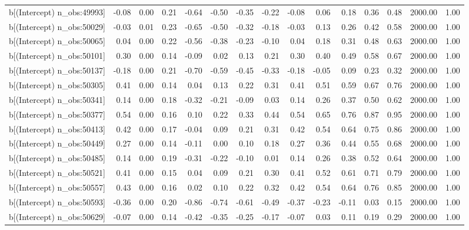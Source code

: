 \begin{table}[ht]
\begin{tabular}{rrrrrrrrrrrrrrr}
  b[(Intercept) n\_obs:49993] & -0.08 & 0.00 & 0.21 & -0.64 & -0.50 & -0.35 & -0.22 & -0.08 & 0.06 & 0.18 & 0.36 & 0.48 & 2000.00 & 1.00 \\ 
  b[(Intercept) n\_obs:50029] & -0.03 & 0.01 & 0.23 & -0.65 & -0.50 & -0.32 & -0.18 & -0.03 & 0.13 & 0.26 & 0.42 & 0.58 & 2000.00 & 1.00 \\ 
  b[(Intercept) n\_obs:50065] & 0.04 & 0.00 & 0.22 & -0.56 & -0.38 & -0.23 & -0.10 & 0.04 & 0.18 & 0.31 & 0.48 & 0.63 & 2000.00 & 1.00 \\ 
  b[(Intercept) n\_obs:50101] & 0.30 & 0.00 & 0.14 & -0.09 & 0.02 & 0.13 & 0.21 & 0.30 & 0.40 & 0.49 & 0.58 & 0.67 & 2000.00 & 1.00 \\ 
  b[(Intercept) n\_obs:50137] & -0.18 & 0.00 & 0.21 & -0.70 & -0.59 & -0.45 & -0.33 & -0.18 & -0.05 & 0.09 & 0.23 & 0.32 & 2000.00 & 1.00 \\ 
  b[(Intercept) n\_obs:50305] & 0.41 & 0.00 & 0.14 & 0.04 & 0.13 & 0.22 & 0.31 & 0.41 & 0.51 & 0.59 & 0.67 & 0.76 & 2000.00 & 1.00 \\ 
  b[(Intercept) n\_obs:50341] & 0.14 & 0.00 & 0.18 & -0.32 & -0.21 & -0.09 & 0.03 & 0.14 & 0.26 & 0.37 & 0.50 & 0.62 & 2000.00 & 1.00 \\ 
  b[(Intercept) n\_obs:50377] & 0.54 & 0.00 & 0.16 & 0.10 & 0.22 & 0.33 & 0.44 & 0.54 & 0.65 & 0.76 & 0.87 & 0.95 & 2000.00 & 1.00 \\ 
  b[(Intercept) n\_obs:50413] & 0.42 & 0.00 & 0.17 & -0.04 & 0.09 & 0.21 & 0.31 & 0.42 & 0.54 & 0.64 & 0.75 & 0.86 & 2000.00 & 1.00 \\ 
  b[(Intercept) n\_obs:50449] & 0.27 & 0.00 & 0.14 & -0.11 & 0.00 & 0.10 & 0.18 & 0.27 & 0.36 & 0.44 & 0.55 & 0.68 & 2000.00 & 1.00 \\ 
  b[(Intercept) n\_obs:50485] & 0.14 & 0.00 & 0.19 & -0.31 & -0.22 & -0.10 & 0.01 & 0.14 & 0.26 & 0.38 & 0.52 & 0.64 & 2000.00 & 1.00 \\ 
  b[(Intercept) n\_obs:50521] & 0.41 & 0.00 & 0.15 & 0.04 & 0.09 & 0.21 & 0.30 & 0.41 & 0.52 & 0.61 & 0.71 & 0.79 & 2000.00 & 1.00 \\ 
  b[(Intercept) n\_obs:50557] & 0.43 & 0.00 & 0.16 & 0.02 & 0.10 & 0.22 & 0.32 & 0.42 & 0.54 & 0.64 & 0.76 & 0.85 & 2000.00 & 1.00 \\ 
  b[(Intercept) n\_obs:50593] & -0.36 & 0.00 & 0.20 & -0.86 & -0.74 & -0.61 & -0.49 & -0.37 & -0.23 & -0.11 & 0.03 & 0.15 & 2000.00 & 1.00 \\ 
  b[(Intercept) n\_obs:50629] & -0.07 & 0.00 & 0.14 & -0.42 & -0.35 & -0.25 & -0.17 & -0.07 & 0.03 & 0.11 & 0.19 & 0.29 & 2000.00 & 1.00 \\ 

\end{tabular}
\end{table}
